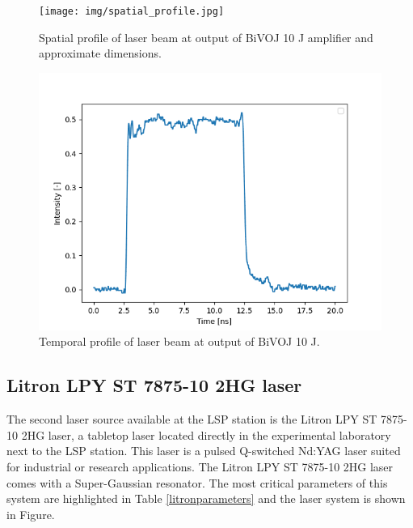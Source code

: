 \begin{figure}[h]
    \centering
    \texttt{[image: img/spatial\_profile.jpg]}
    \caption{Spatial profile of laser beam at output of BiVOJ 10 J amplifier and approximate dimensions.}
    \label{fig:spatialprofile}
\end{figure}

\begin{figure}[h]
    \centering
    \includegraphics[width=0.6\linewidth]{img/temporal_profile_bivoj.png}
    \caption{Temporal profile of laser beam at output of BiVOJ 10 J.}
    \label{fig:temporalprofile}
\end{figure}

\subsection{Litron LPY ST 7875-10 2HG laser}

The second laser source available at the LSP station is the Litron LPY ST 7875-10 2HG laser, a tabletop laser located directly in the experimental laboratory next to the LSP station. This laser is a pulsed Q-switched Nd:YAG laser suited for industrial or research applications. The Litron  LPY ST 7875-10 2HG laser comes with a Super-Gaussian resonator. The most critical parameters of this system are highlighted in Table \ref{litronparameters} and the laser system is shown in Figure. 


